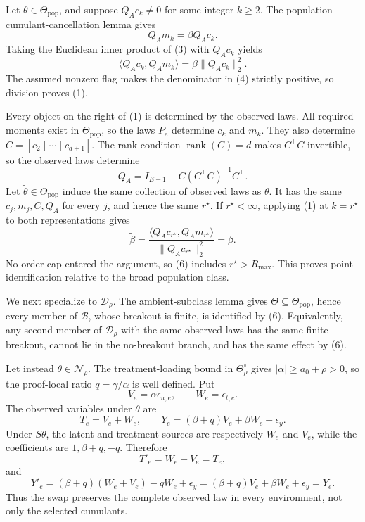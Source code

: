 Let \(\theta\in\Theta_{\mathrm{pop}}\), and suppose \(Q_Ac_k\neq0\) for some integer \(k\geq2\).  The population cumulant-cancellation lemma gives
\[
 Q_Am_k=\beta Q_Ac_k.                                                       \tag{3}
\]
Taking the Euclidean inner product of (3) with \(Q_Ac_k\) yields
\[
 \langle Q_Ac_k,Q_Am_k\rangle
 =\beta\lVert Q_Ac_k\rVert_2^2.                                          \tag{4}
\]
The assumed nonzero flag makes the denominator in (4) strictly positive, so division proves (1).

Every object on the right of (1) is determined by the observed laws.  All required moments exist in \(\Theta_{\mathrm{pop}}\), so the laws \(P_e\) determine \(c_k\) and \(m_k\).  They also determine \(C=[c_2\mid\cdots\mid c_{d+1}]\).  The rank condition \(\operatorname{rank}(C)=d\) makes \(C^\top C\) invertible, so the observed laws determine
\[
 Q_A=I_{E-1}-C(C^\top C)^{-1}C^\top.                                    \tag{5}
\]
Let \(\widetilde\theta\in\Theta_{\mathrm{pop}}\) induce the same collection of observed laws as \(\theta\).  It has the same \(c_j,m_j,C,Q_A\) for every \(j\), and hence the same \(r^\star\).  If \(r^\star<\infty\), applying (1) at \(k=r^\star\) to both representations gives
\[
 \widetilde\beta
 =\frac{\langle Q_Ac_{r^\star},Q_Am_{r^\star}\rangle}
        {\lVert Q_Ac_{r^\star}\rVert_2^2}
 =\beta.                                                                   \tag{6}
\]
No order cap entered the argument, so (6) includes \(r^\star>R_{\max}\).  This proves point identification relative to the broad population class.

We next specialize to \(\mathcal D_\rho\).  The ambient-subclass lemma gives \(\Theta\subseteq\Theta_{\mathrm{pop}}\), hence every member of \(\mathcal B\), whose breakout is finite, is identified by (6).  Equivalently, any second member of \(\mathcal D_\rho\) with the same observed laws has the same finite breakout, cannot lie in the no-breakout branch, and has the same effect by (6).

Let instead \(\theta\in\mathcal N_\rho\).  The treatment-loading bound in \(\Theta_\rho^\circ\) gives \(|\alpha|\geq a_0+\rho>0\), so the proof-local ratio \(q=\gamma/\alpha\) is well defined.  Put
\[
 V_e=\alpha\epsilon_{u,e},
 \qquad W_e=\epsilon_{t,e}.
\]
The observed variables under \(\theta\) are
\[
 T_e=V_e+W_e,
 \qquad
 Y_e=(\beta+q)V_e+\beta W_e+\epsilon_y.                                   \tag{7}
\]
Under \(S\theta\), the latent and treatment sources are respectively \(W_e\) and \(V_e\), while the coefficients are \(1,\beta+q,-q\).  Therefore
\[
 T'_e=W_e+V_e=T_e,
\]
and
\[
 Y'_e=(\beta+q)(W_e+V_e)-qW_e+\epsilon_y
     =(\beta+q)V_e+\beta W_e+\epsilon_y=Y_e.                              \tag{8}
\]
Thus the swap preserves the complete observed law in every environment, not only the selected cumulants.

